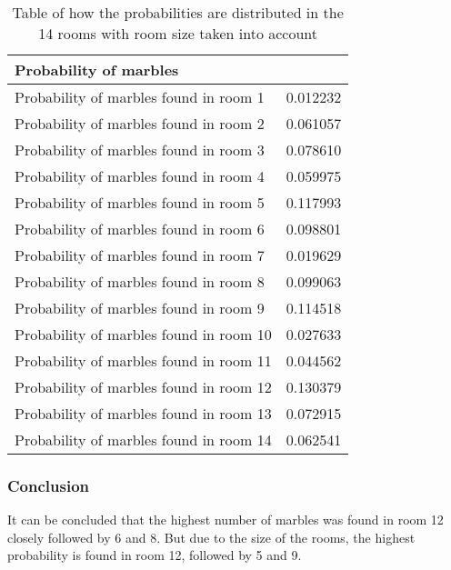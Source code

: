 \documentclass[../Head/Main.tex]{subfiles}
\begin{document}
\begin{minipage}[c]{0.49\textwidth}
	\begin{table}[H]
	\centering
	\begin{tabular}{l r}
		\hline
		\multicolumn{2}{l}{\textbf{Probability of marbles}}  			\\ \hline
		Probability of marbles found in room 1  & 0.012232\\
		Probability of marbles found in room 2  & 0.061057\\
		Probability of marbles found in room 3  & 0.078610\\
		Probability of marbles found in room 4  & 0.059975\\
		Probability of marbles found in room 5  & 0.117993\\
		Probability of marbles found in room 6  & 0.098801\\
		Probability of marbles found in room 7  & 0.019629\\
		Probability of marbles found in room 8  & 0.099063\\
		Probability of marbles found in room 9  & 0.114518\\
		Probability of marbles found in room 10 & 0.027633\\
		Probability of marbles found in room 11 & 0.044562\\
		Probability of marbles found in room 12 & 0.130379\\
		Probability of marbles found in room 13 & 0.072915\\
		Probability of marbles found in room 14 & 0.062541\\			\hline
	\end{tabular}
	\caption{Table of how the probabilities are distributed in the 14 rooms with room size taken into account}
	\label{tab:probability_data}
\end{table}
\end{minipage}

\subsubsection{Conclusion}
It can be concluded that the highest number of marbles was found in room 12 closely followed by 6 and 8. But due to the size of the rooms, the highest probability is found in room 12, followed by 5 and 9.
\end{document}
